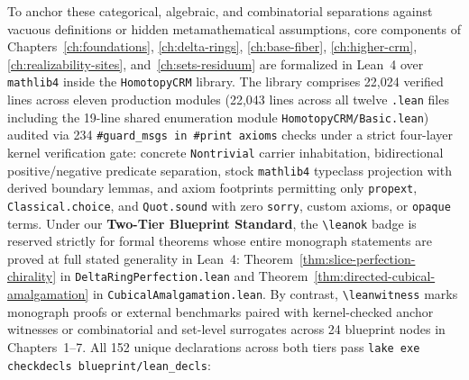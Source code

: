 \documentclass[10pt,twoside,openright]{book}
\theoremstyle{crmplain}
\theoremstyle{crmdef}
\theoremstyle{crmremark}
\begin{document}
To anchor these categorical, algebraic, and combinatorial separations against vacuous definitions or hidden metamathematical assumptions, core components of Chapters~\ref{ch:foundations}, \ref{ch:delta-rings}, \ref{ch:base-fiber}, \ref{ch:higher-crm}, \ref{ch:realizability-sites}, and~\ref{ch:sets-residuum} are formalized in Lean~4 over \texttt{mathlib4} inside the \texttt{HomotopyCRM} library. The library comprises 22,024 verified lines across eleven production modules (22,043 lines across all twelve \texttt{.lean} files including the 19-line shared enumeration module \texttt{HomotopyCRM/\allowbreak Basic.lean}) audited via 234 \texttt{\#guard\_msgs in \#print axioms} checks under a strict four-layer kernel verification gate: concrete \texttt{Nontrivial} carrier inhabitation, bidirectional positive/negative predicate separation, stock \texttt{mathlib4} typeclass projection with derived boundary lemmas, and axiom footprints permitting only \texttt{propext}, \texttt{Classical.choice}, and \texttt{Quot.sound} with zero \texttt{sorry}, custom axioms, or \texttt{opaque} terms. Under our \textbf{Two-Tier Blueprint Standard}, the \texttt{\textbackslash leanok} badge is reserved strictly for formal theorems whose entire monograph statements are proved at full stated generality in Lean~4: Theorem~\ref{thm:slice-perfection-chirality} in \texttt{DeltaRing\allowbreak Perfection.lean} and Theorem~\ref{thm:directed-cubical-amalgamation} in \texttt{Cubical\allowbreak Amalgamation.lean}. By contrast, \texttt{\textbackslash leanwitness} marks monograph proofs or external benchmarks paired with kernel-checked anchor witnesses or combinatorial and set-level surrogates across 24 blueprint nodes in Chapters~1--7. All 152 unique declarations across both tiers pass \texttt{lake exe checkdecls blueprint/\allowbreak lean\_decls}:
\end{document}
